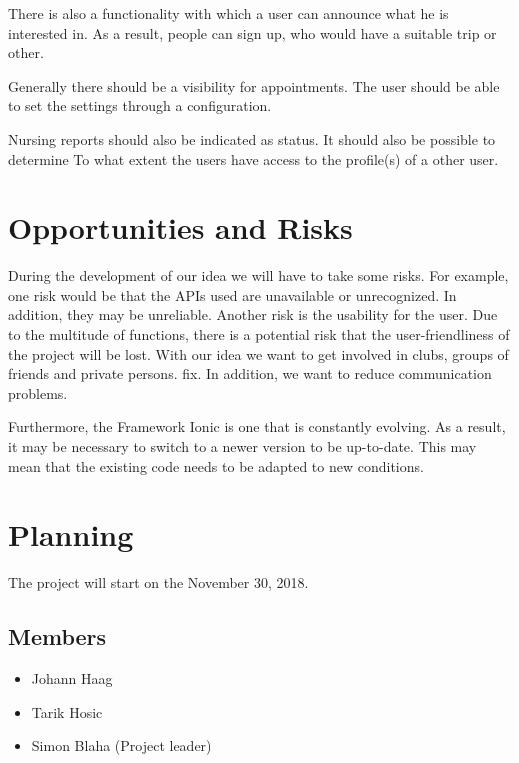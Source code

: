 \documentclass[12pt]{scrartcl}
\begin{document}
        There is also a functionality with which a user can announce what he is interested in.
        As a result, people can sign up, who would have a suitable trip or other.
        
        Generally there should be a visibility for appointments.
        The user should be able to set the settings through a configuration.
        
        Nursing reports should also be indicated as status. It should also be possible to determine
        To what extent the users have access to the profile(s) of a other user.
    \pagebreak

    \section{Opportunities and Risks}
        During the development of our idea we will have to take some risks. For example, one risk would be that the APIs used are unavailable or unrecognized. In addition, they may be unreliable.
        Another risk is the usability for the user. Due to the multitude of functions, there is a potential risk that the user-friendliness of the project will be lost. 
        With our idea we want to get involved in clubs, groups of friends and private persons.
        fix. In addition, we want to reduce communication problems.

       
        Furthermore, the Framework Ionic is one that is constantly evolving. As a result, it may be necessary to switch to a newer version to be up-to-date.
        This may mean that the existing code needs to be adapted to new conditions.
    \pagebreak

    \section{Planning}

    \vspace*{15pt}

    The project will start on the November 30, 2018.

    \subsection{Members}
    \begin{itemize}
        \item Johann Haag
        \item Tarik Hosic
        \item Simon Blaha (Project leader)
    \end{itemize}
\end{document}
